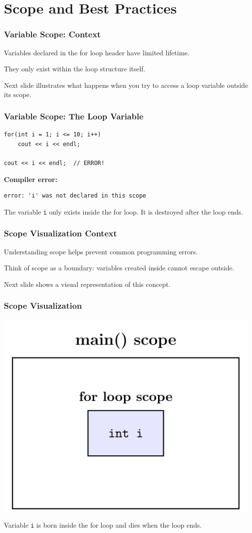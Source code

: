 \documentclass{beamer}
\begin{document}
\section{Scope and Best Practices}

\begin{frame}
\frametitle{Variable Scope: Context}
Variables declared in the for loop header have limited lifetime.\pause

They only exist within the loop structure itself.\pause

Next slide illustrates what happens when you try to access a loop variable outside its scope.
\end{frame}

\begin{frame}[fragile]
\frametitle{Variable Scope: The Loop Variable}
\begin{verbatim}
for(int i = 1; i <= 10; i++)
    cout << i << endl;

cout << i << endl;  // ERROR!
\end{verbatim}
\pause

\textbf{Compiler error:}
\begin{verbatim}
error: 'i' was not declared in this scope
\end{verbatim}
\pause

The variable \texttt{i} only exists inside the for loop. It is destroyed after the loop ends.
\end{frame}

\begin{frame}
\frametitle{Scope Visualization Context}
Understanding scope helps prevent common programming errors.\pause

Think of scope as a boundary: variables created inside cannot escape outside.\pause

Next slide shows a visual representation of this concept.
\end{frame}

\begin{frame}
\frametitle{Scope Visualization}
\includegraphics[width=\textwidth]{../images/scope-loop.png}

Variable \texttt{i} is born inside the for loop and dies when the loop ends.
\end{frame}
\end{document}
